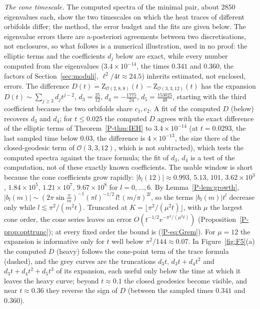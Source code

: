 \documentclass[pdflatex,sn-mathphys-num]{sn-jnl}
\newcommand{\Orb}{\mathcal{O}}
\newcommand{\cZ}{\mathrm{Z}}
\newcommand{\pref}[1]{\ref*{P-#1}}%
\theoremstyle{thmstyleone}%
\theoremstyle{thmstylethree}%
\providecommand{\Orb}{\mathcal{O}}
\providecommand{\cZ}{\mathrm{Z}}
\begin{document}
\emph{The cone timescale.} The computed spectra of the minimal pair, about $2850$ eigenvalues each, show the two timescales on which the heat traces of different orbifolds differ; the method, the error budget and the fits are given below. The eigenvalue errors there are a-posteriori agreements between two discretisations, not enclosures, so what follows is a numerical illustration, used in no proof: the elliptic terms and the coefficients $d_j$ below are exact, while every number computed from the eigenvalues ($3.4\times10^{-14}$, the times $0.341$ and $0.360$, the factors of Section~\ref{sec:moduli}, $\ell^2/4t\approx24.5$) inherits estimated, not enclosed, errors. The difference $D(t)=\cZ_{\Orb(2,8,8)}(t)-\cZ_{\Orb(3,3,12)}(t)$ has the expansion $D(t)\sim\sum_{j\ge3}d_jt^{j-2}$, $d_3=\frac{25}{12}$, $d_4=-\frac{1775}{24}$, $d_5=\frac{153025}{48}$, starting with the third coefficient because the two orbifolds share $c_1,c_2$. A fit of the computed $D$ (below) recovers $d_3$ and $d_4$; for $t\le0.025$ the computed $D$ agrees with the exact difference of the elliptic terms of Theorem~\pref{thm:IEH} to $3.4\times10^{-14}$ (at $t=0.0293$, the last sampled time below $0.03$, the difference is $4\times10^{-13}$, the size there of the closed-geodesic term of $\Orb(3,3,12)$, which is not subtracted), which tests the computed spectra against the trace formula; the fit of $d_3$, $d_4$ is a test of the computation, not of these exactly known coefficients. The usable window is short because the cone coefficients grow rapidly: $|b_l(12)|\approx0.993$, $5.13$, $101$, $3.62\times10^3$, $1.84\times10^5$, $1.21\times10^7$, $9.67\times10^8$ for $l=0,\dots,6$. By Lemma~\pref{lem:growth}, $|b_l(m)|\sim(2\pi\sin\frac\pi m)^{-1}(\pi l)^{-1/2}\,l!\,(m/\pi)^{2l}$, so the terms $|b_l(m)|t^l$ decrease only while $l\lesssim\pi^2/(m^2t)$. Truncated at $K=\lfloor\pi^2/(\mu^2t)\rfloor$, with $\mu$ the largest cone order, the cone series leaves an error $O(t^{-1/2}e^{-\pi^2/(\mu^2t)})$ (Proposition~\pref{prop:opttrunc}); at every fixed order the bound is (\pref{eq:Grem}). For $\mu=12$ the expansion is informative only for $t$ well below $\pi^2/144\approx0.07$. In Figure~\ref{fig:F5}(a) the computed $D$ (heavy) follows the cone-point term of the trace formula (dashed), and the grey curves are the truncations $d_3t$, $d_3t+d_4t^2$ and $d_3t+d_4t^2+d_5t^3$ of its expansion, each useful only below the time at which it leaves the heavy curve; beyond $t\approx0.1$ the closed geodesics become visible, and near $t\approx0.36$ they reverse the sign of $D$ (between the sampled times $0.341$ and $0.360$).
\end{document}
